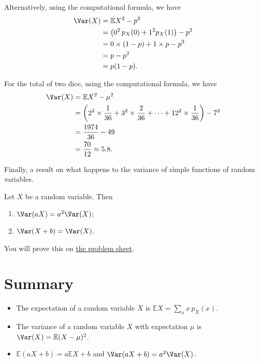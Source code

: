 \documentclass[
  letterpaper,
]{report}
\providecommand{\tightlist}{%
  \setlength{\itemsep}{0pt}\setlength{\parskip}{0pt}}\usepackage{longtable,booktabs,array}
\theoremstyle{definition}
\theoremstyle{definition}
\theoremstyle{remark}
\begin{document}
Alternatively, using the computational formula, we have \begin{align*}
\Var(X) &= \mathbb EX^2 - p^2 \\
        &= \big(0^2\,p_X(0) + 1^2 p_X(1)\big) - p^2 \\
        &= 0\times(1-p) + 1\times p - p^2 \\
        &= p - p^2 \\
        &= p(1-p) .
\end{align*}

For the total of two dice, using the computational formula, we have
\begin{align*}
\Var(X) &= \mathbb EX^2 - \mu^2 \\
        &= \left(2^2 \times \frac{1}{36} + 3^2 \times \frac{2}{36} + \cdots + 12^2 \times \frac{1}{36}\right) - 7^2 \\
        &= \frac{1974}{36} - 49 \\
        &= \frac{70}{12} \approx 5.8 .
\end{align*}

Finally, a result on what happens to the variance of simple functions of
random variables.

Let \(X\) be a random variable. Then

\begin{enumerate}
\def\labelenumi{\arabic{enumi}.}
\tightlist
\item
  \(\Var(aX) = a^2\Var (X)\);
\item
  \(\Var(X + b) = \Var(X)\).
\end{enumerate}

You will prove this on \protect\hyperlink{P3}{the problem sheet}.

\hypertarget{summary-L10}{%
\section*{Summary}\label{summary-L10}}


\begin{itemize}
\tightlist
\item
  The expectation of a random variable \(X\) is
  \(\mathbb EX = \sum_x x\, p_X(x)\).
\item
  The variance of a random variable \(X\) with expectation \(\mu\) is
  \(\Var(X) = \mathbb E(X - \mu)^2\).
\item
  \(\mathbb E(aX+b) = a\mathbb EX + b\) and \(\Var(aX+b) = a^2\Var(X)\).
\end{itemize}
\end{document}
